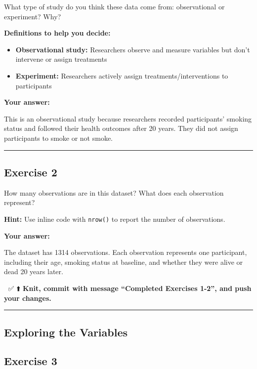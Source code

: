 \documentclass[]{tufte-handout}
\providecommand{\tightlist}{%
  \setlength{\itemsep}{0pt}\setlength{\parskip}{0pt}}
\begin{document}
What type of study do you think these data come from: observational or
experiment? Why?

\textbf{Definitions to help you decide:}

\begin{itemize}
\tightlist
\item
  \textbf{Observational study:} Researchers observe and measure
  variables but don't intervene or assign treatments
\item
  \textbf{Experiment:} Researchers actively assign
  treatments/interventions to participants
\end{itemize}

\textbf{Your answer:}

This is an observational study because researchers recorded
participants' smoking status and followed their health outcomes after 20
years. They did not assign participants to smoke or not smoke.

\begin{center}\rule{0.5\linewidth}{0.5pt}\end{center}

\subsection{Exercise 2}\label{exercise-2}

How many observations are in this dataset? What does each observation
represent?

\textbf{Hint:} Use inline code with \texttt{nrow()} to report the number
of observations.

\textbf{Your answer:}

The dataset has 1314 observations. Each observation represents one
participant, including their age, smoking status at baseline, and
whether they were alive or dead 20 years later.

🧶 ✅ ⬆️ \textbf{Knit, commit with message ``Completed Exercises 1-2'',
and push your changes.}

\begin{center}\rule{0.5\linewidth}{0.5pt}\end{center}

\subsection{Exploring the Variables}\label{exploring-the-variables}

\subsection{Exercise 3}\label{exercise-3}
\end{document}
